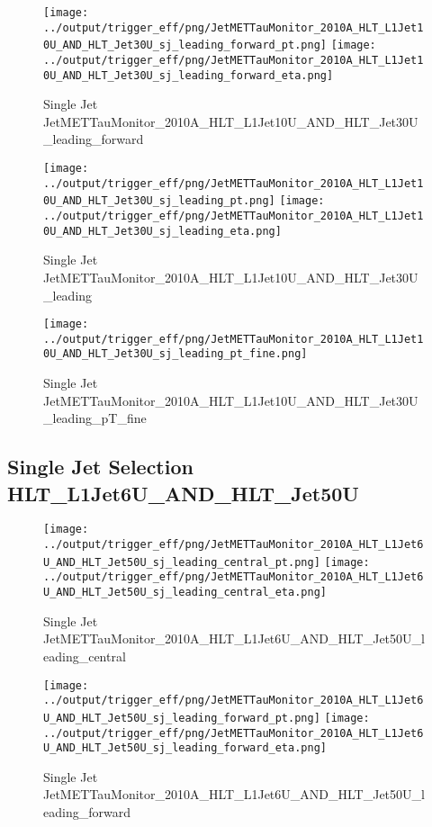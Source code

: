 \documentclass[11pt]{article}
\begin{document}
\begin{figure}[ht]
\centering
\texttt{[image: ../output/trigger\_eff/png/JetMETTauMonitor\_2010A\_HLT\_L1Jet10U\_AND\_HLT\_Jet30U\_sj\_leading\_forward\_pt.png]}
\texttt{[image: ../output/trigger\_eff/png/JetMETTauMonitor\_2010A\_HLT\_L1Jet10U\_AND\_HLT\_Jet30U\_sj\_leading\_forward\_eta.png]}
\caption{Single Jet JetMETTauMonitor\_2010A\_HLT\_L1Jet10U\_AND\_HLT\_Jet30U\_leading\_forward}
\label{fig:jetmettaumon_sj_HLT_L1Jet10U_AND_HLT_Jet30U_leading_forward}
\end{figure}

\begin{figure}[ht]
\centering
\texttt{[image: ../output/trigger\_eff/png/JetMETTauMonitor\_2010A\_HLT\_L1Jet10U\_AND\_HLT\_Jet30U\_sj\_leading\_pt.png]}
\texttt{[image: ../output/trigger\_eff/png/JetMETTauMonitor\_2010A\_HLT\_L1Jet10U\_AND\_HLT\_Jet30U\_sj\_leading\_eta.png]}
\caption{Single Jet JetMETTauMonitor\_2010A\_HLT\_L1Jet10U\_AND\_HLT\_Jet30U\_leading}
\label{fig:jetmettaumon_sj_HLT_L1Jet10U_AND_HLT_Jet30U_leading}
\end{figure}

\begin{figure}[ht]
\centering
\texttt{[image: ../output/trigger\_eff/png/JetMETTauMonitor\_2010A\_HLT\_L1Jet10U\_AND\_HLT\_Jet30U\_sj\_leading\_pt\_fine.png]}
\caption{Single Jet JetMETTauMonitor\_2010A\_HLT\_L1Jet10U\_AND\_HLT\_Jet30U\_leading\_pT\_fine}
\label{fig:jetmettaumon_sj_HLT_L1Jet10U_AND_HLT_Jet30U_leading_pT_fine}
\end{figure}
\clearpage


\newpage
\subsection{Single Jet Selection HLT\_L1Jet6U\_AND\_HLT\_Jet50U}
\begin{figure}[ht]
\centering
\texttt{[image: ../output/trigger\_eff/png/JetMETTauMonitor\_2010A\_HLT\_L1Jet6U\_AND\_HLT\_Jet50U\_sj\_leading\_central\_pt.png]}
\texttt{[image: ../output/trigger\_eff/png/JetMETTauMonitor\_2010A\_HLT\_L1Jet6U\_AND\_HLT\_Jet50U\_sj\_leading\_central\_eta.png]}
\caption{Single Jet JetMETTauMonitor\_2010A\_HLT\_L1Jet6U\_AND\_HLT\_Jet50U\_leading\_central}
\label{fig:jetmettaumon_sj_HLT_L1Jet6U_AND_HLT_Jet50U_leading_central}
\end{figure}

\begin{figure}[ht]
\centering
\texttt{[image: ../output/trigger\_eff/png/JetMETTauMonitor\_2010A\_HLT\_L1Jet6U\_AND\_HLT\_Jet50U\_sj\_leading\_forward\_pt.png]}
\texttt{[image: ../output/trigger\_eff/png/JetMETTauMonitor\_2010A\_HLT\_L1Jet6U\_AND\_HLT\_Jet50U\_sj\_leading\_forward\_eta.png]}
\caption{Single Jet JetMETTauMonitor\_2010A\_HLT\_L1Jet6U\_AND\_HLT\_Jet50U\_leading\_forward}
\label{fig:jetmettaumon_sj_HLT_L1Jet6U_AND_HLT_Jet50U_leading_forward}
\end{figure}
\end{document}
